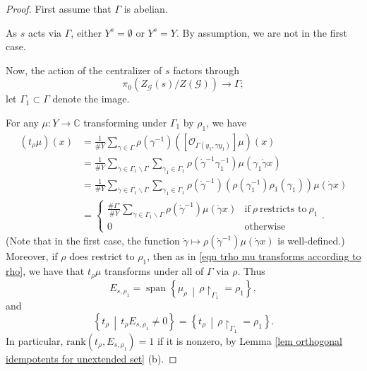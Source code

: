\documentclass[10pt,a4paper]{amsart}
\DeclareMathOperator{\spn}{span}
\newcommand{\C}{\mathbb{C}}
\newcommand{\Oo}{\mathcal{O}}
\newcommand{\Restriction}{\upharpoonright}
\newcommand{\Zz}{\mathcal{G}}
\newcommand{\rquotient}{\backslash}
\newcommand{\sets}[2]{\left\{#1\,\middle|\,#2\right\}}
\begin{document}
\begin{proof}
First assume that $\Gamma$ is abelian.

As $s$ acts via $\Gamma$, either $Y^s=\emptyset$ or $Y^s=Y$. By assumption, 
we are not in the first case.

Now, the action of the centralizer of $s$ factors through 
%
\[
\pi_0(Z_{\Zz}(s)/Z(\Zz))\to\Gamma;
\]
%
let $\Gamma_1\subset\Gamma$ denote the image.

For any $\mu\colon Y\to\C$ transforming under $\Gamma_1$ by $\rho_1$, we have
% 
\begin{align*}
(t_{\rho}\mu)(x)
&=
\frac{1}{\# Y}
\sum_{\gamma\in\Gamma}\rho(\gamma^{-1})\left([\Oo_{\Gamma(y_1,\gamma y_1)}]\mu\right)(x)
\\
&=
\frac{1}{\# Y}
\sum_{\dot{\gamma}\in\Gamma_1\rquotient\Gamma}\sum_{\gamma_1\in\Gamma_1}
\rho(\dot{\gamma}^{-1}\gamma_1^{-1})\mu(\gamma_1\dot{\gamma} x)
\\
&=
\frac{1}{\# Y}
\sum_{\dot{\gamma}\in\Gamma_1\rquotient\Gamma}\sum_{\gamma_1\in\Gamma_1}
\rho(\dot{\gamma}^{-1})\left(\rho(\gamma_1^{-1})\rho_1(\gamma_1)\right)\mu(\dot{\gamma} x)
\\
&=
\begin{cases}
\frac{\#\Gamma'}{\# Y}\sum_{\dot{\gamma}\in\Gamma_1\rquotient\Gamma}\rho(\dot{\gamma}^{-1})\mu(\dot{\gamma}x)& \text{if}~\rho~\text{restricts to}~\rho_1
\\
0&\text{otherwise}
\end{cases}.
\end{align*}
%
(Note that in the first case, the function $\dot{\gamma}\mapsto\rho(\dot{\gamma}^{-1})\mu(\dot{\gamma}x)$ is well-defined.)
Moreover, if $\rho$ does restrict to $\rho_1$, then as in \eqref{eqn trho mu transforms according to rho}, we have that 
$t_\rho\mu$ transforms under all of $\Gamma$ via $\rho$.
%
Thus
%
\[
E_{s,\rho_1}=\spn{\sets{\mu_{\rho}}{\rho\Restriction_{\Gamma_1}=\rho_1}},
\]
%
and
%
\[
\sets{t_\rho}{t_\rho E_{s,\rho_1}\neq 0}=\sets{t_\rho}{\rho\Restriction_{\Gamma_1}=\rho_1}.
\]
%
In particular, $\mathrm{rank}(t_\rho, E_{s,\rho_1})=1$ if it is nonzero, by 
Lemma \ref{lem orthogonal idempotents for unextended set} (b).



\end{proof}
\end{document}

